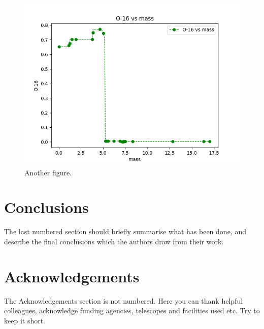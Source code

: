 \documentclass[fleqn,usenatbib]{mnras}
\begin{document}
\begin{figure}
	\includegraphics[width=\columnwidth]{figs/figure_template/mass-O16}
    \caption{Another figure.}
\end{figure}

\section{Conclusions}

The last numbered section should briefly summarise what has been done, and describe
the final conclusions which the authors draw from their work.

\section*{Acknowledgements}

The Acknowledgements section is not numbered. Here you can thank helpful
colleagues, acknowledge funding agencies, telescopes and facilities used etc.
Try to keep it short.





\end{document}
